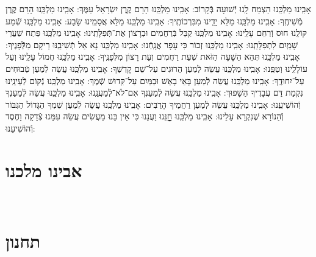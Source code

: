 \documentclass[twoside, openany, parskip=half, 11pt]{book}
\begin{document}
{	אָבִֽינוּ מַלְכֵּֽנוּ הַצְמַח לָֽנוּ יְֿשׁוּעָה בְּֿקָרוֹב:\hfill \break
	אָבִֽינוּ מַלְכֵּֽנוּ הָרֵם קֶֽרֶן יִשְׂרָאֵל עַמֶּךָ:\hfill \break
	אָבִֽינוּ מַלְכֵּֽנוּ הָרֵם קֶרֶן מְֿשִׁיחֶֽךָ:\hfill \break
	אָבִֽינוּ מַלְכֵּֽנוּ מַלֵּא יָדֵֽינוּ מִבִּרְכוֹתֶֽיךָ:\hfill \break
	אָבִֽינוּ מַלְכֵּֽנוּ מַלֵּא אֲסָמֵֽינוּ שָׂבָע:\hfill \break
	אָבִֽינוּ מַלְכֵּֽנוּ שְֿׁמַע קּוֹלֵֽנוּ חוּס וְֿרַחֵם עָלֵֽינוּ:\hfill \break
	אָבִֽינוּ מַלְכֵּֽנוּ קַבֵּל בְּֿרַחֲמִים וּבְרָצוֹן אֶת־תְּֿֿפִלָּתֵֽינוּ:\hfill \break
	אָבִֽינוּ מַלְכֵּֽנוּ פְּתַח שַׁעֲרֵי שָׁמַֽיִם לִתְפִלָּתֵֽנוּ:\hfill \break
	אָבִֽינוּ מַלְכֵּֽנוּ זְכוֹר כִּי עָפָר אֲנָֽחְֿנוּ:\hfill \break
	אָבִֽינוּ מַלְכֵּֽנוּ נָא אַל תְּֿשִׁיבֵֽנּוּ רֵיקָם מִלְּֿֿפָנֶיךָ:\hfill \break
	אָבִֽינוּ מַלְכֵּֽנוּ תְּהֵא הַשָּׁעָה הַזֹּאת שְׁעַת רַחֲמִים וְעֵת רָצוֹן מִלְּפָנֶֽיךָ:\hfill \break
	אָבִֽינוּ מַלְכֵּֽנוּ חֲמוֹל עָלֵֽינוּ וְעַל עוֹלָלֵֽינוּ וְטַפֵּֽנוּ:\hfill \break
	אָבִֽינוּ מַלְכֵּֽנוּ עֲשֵׂה לְֿמַעַן הֲרוּגִים עַל־שֵׁם קׇדְשֶׁךָ:\hfill \break
	אָבִֽינוּ מַלְכֵּֽנוּ עֲשֵׂה לְֿמַעַן טְֿבוּחִים עַל־יִחוּדֶֽךָ:\hfill \break
	אָבִֽינוּ מַלְכֵּֽנוּ עֲשֵׂה לְֿמַעַן בָּאֵי בָאֵשׁ וּבַמַּיִם עַל־קִּדוּשׁ שְֿׁמֶךָ:\hfill \break
	אָבִֽינוּ מַלְכֵּֽנוּ נְֿקוֹם לְֿעֵינֵֽינוּ נִקְמַת דַּם עֲבָדֶיךָ הַשָׁפוּךְ:\hfill \break
	אָבִֽינוּ מַלְכֵּֽנוּ עֲשֵׂה לְֿמַעַנְךָ אִם־לֹא־לְֿֿמַעֲנֵֽנוּ:\hfill \break
	אָבִֽינוּ מַלְכֵּֽנוּ עֲשֵׂה לְֿמַעַנְךָ וְֿהוֹשִׁיעֵֽנוּ:\hfill \break
	אָבִֽינוּ מַלְכֵּֽנוּ עֲשֵׂה לְֿמַעַן רַחֲמֶיךָ הָרַבִּים:\hfill \break
	אָבִֽינוּ מַלְכֵּֽנוּ עֲשֵׂה לְֿמַעַן שִׁמְךָ הַגָּדוֹל הַגִּבּוֹר וְֿהַנוֹרָא שֶׁנִקְרָא עָלֵינוּ:\hfill \break
	אָבִֽינוּ מַלְכֵּֽנוּ חׇׇׇׇׇׇָנֵּנוּ וַעֲנֵנוּ כִּי אֵין בָּנוּ מַעֲשִׂים עֲשֵׂה עִמָּנוּ צְֿדָקָה וָחֶסֶד וְֿהוֹשִׁיעֵנוּ:
	
}

\section[אבינו מלכנו]{ אבינו מלכנו }
\label{avinu malkeinu}


\avinumalkeinu

\vfill
{}\\
\section[תחנון]{ תחנון }
\label{tachanun mon thurs}
\end{document}
